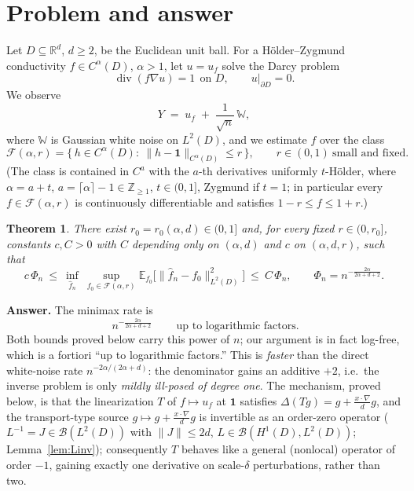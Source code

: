 \documentclass[11pt]{article}
\newtheorem{theorem}{Theorem}[section]
\theoremstyle{remark}
\newcommand{\R}{\mathbb{R}}
\newcommand{\E}{\mathbb{E}}
\newcommand{\F}{\mathcal{F}}
\newcommand{\W}{\mathbb{W}}
\newcommand{\one}{\mathbf{1}}
\newcommand{\norm}[1]{\lVert #1\rVert}
\newcommand{\SET}[1]{\{#1\}}
\DeclareMathOperator{\diver}{div}
\begin{document}
\section{Problem and answer}

Let $D\subseteq\R^{d}$, $d\ge2$, be the Euclidean unit ball. For a
H\"older--Zygmund conductivity $f\in C^{\alpha}(D)$, $\alpha>1$, let
$u=u_{f}$ solve the Darcy problem
\[
\diver(f\nabla u)=1\ \ \text{on }D,\qquad u|_{\partial D}=0 .
\]
We observe
\[
Y\;=\;u_{f}\;+\;\frac{1}{\sqrt{n}}\,\W ,
\]
where $\W$ is Gaussian white noise on $L^{2}(D)$, and we estimate $f$ over
the class
\[
\F(\alpha,r)=\SET{\,h\in C^{\alpha}(D):\ \norm{h-\one}_{C^{\alpha}(D)}\le r\,},
\qquad r\in(0,1)\ \text{small and fixed}.
\]
(The class is contained in $C^{a}$ with the $a$-th derivatives uniformly
$t$-H\"older, where $\alpha=a+t$, $a=\lceil\alpha\rceil-1\in\mathbb Z_{\ge1}$,
$t\in(0,1]$, Zygmund if $t=1$; in particular every $f\in\F(\alpha,r)$ is
continuously differentiable and satisfies $1-r\le f\le1+r$.)

\begin{theorem}\label{thm:main}
There exist $r_{0}=r_{0}(\alpha,d)\in(0,1]$ and, for every fixed
$r\in(0,r_{0}]$, constants $c,C>0$ with $C$ depending only on
$(\alpha,d)$ and $c$ on $(\alpha,d,r)$, such that
\[
c\,\Phi_{n}
\ \le\
\inf_{\widehat f_{n}}\ \sup_{f_{0}\in\F(\alpha,r)}
\E_{f_{0}}\!\bigl[\norm{\widehat f_{n}-f_{0}}_{L^{2}(D)}^{2}\bigr]
\ \le\ C\,\Phi_{n},
\qquad
\Phi_{n}=n^{-\frac{2\alpha}{2\alpha+d+2}} .
\]
\end{theorem}

\noindent\textbf{Answer.} The minimax rate is
\[
\boxed{\ n^{-\frac{2\alpha}{2\alpha+d+2}}\ }
\qquad\text{up to logarithmic factors.}
\]
Both bounds proved below carry this power of $n$; our argument is in fact
log-free, which is a fortiori ``up to logarithmic factors.'' This is
\emph{faster} than the
direct white-noise rate $n^{-2\alpha/(2\alpha+d)}$: the denominator gains
an additive $+2$, i.e.\ the inverse problem is only \emph{mildly ill-posed
of degree one}. The mechanism, proved below, is that the linearization $T$
of $f\mapsto u_{f}$ at $\one$ satisfies $\Delta(Tg)=g+\frac{x\cdot\nabla}{d}g$,
and the transport-type source $g\mapsto g+\frac{x\cdot\nabla}{d}g$ is
invertible as an order-zero operator ($L^{-1}=J\in\mathcal B(L^{2}(D))$ with
$\norm{J}\le2d$, $L\in\mathcal B(H^{1}(D),L^{2}(D))$;
Lemma~\ref{lem:Linv}); consequently $T$
behaves like a general (nonlocal) operator of order $-1$, gaining exactly
one derivative on scale-$\delta$ perturbations, rather than two.
\end{document}
